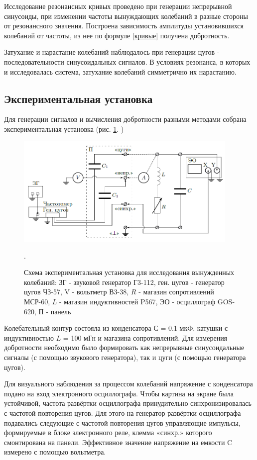 \documentclass[a4paper,12pt]{article} %
\begin{document}
Исследование резонансных кривых проведено при генерации непрерывной синусоиды, при изменении частоты вынуждающих колебаний в разные стороны от резонансного значения. Построена зависимость амплитуды установившихся колебаний от частоты, из нее по формуле \ref{кривые} получена добротность.

Затухание и нарастание колебаний наблюдалось при генерации цугов - последовательности синусоидальных сигналов. В условиях резонанса, в которых и исследовалась система, затухание колебаний симметрично их нарастанию.


\subsection*{Экспериментальная установка}

Для генерации сигналов и вычисления добротности разными методами собрана экспериментальная установка (рис.  \ref{установка}. )
\begin{figure}[h!]
\begin{center}
\includegraphics[width=0.95\textwidth]{установка}
\caption{Схема экспериментальная установка для исследования вынужденных
колебаний: ЗГ - звуковой генератор Г3-112, ген. цугов - генератор цугов ЧЗ-57, V - вольтметр В3-38, $R$ - магазин сопротивлений МСР-60, $L$ - магазин индуктивностей P567, ЭО - осциллограф GOS-620, П - панель} \label{установка}.
\end{center}
\end{figure} 

Колебательный контур состояла из конденсатора $С $ = 0.1 мкФ, катушки с индуктивностью $L$ = 100 мГн и магазина сопротивлений. Для измерения добротности необходимо было формировать как непрерывные синусоидальные сигналы (с помощью звукового генератора), так и цуги (с помощью генератора цугов). 

Для визуального наблюдения за процессом колебаний напряжение с конденсатора подано на вход электронного осциллографа. Чтобы картина на экране была устойчивой, частота развёртки осциллографа принудительно синхронизировалась с частотой повторения цугов. Для этого на генератор развёртки осциллографа подавались следующие с частотой повторения цугов управляющие импульсы, формируемые в блоке электронного реле, клемма «синхр.» которого смонтирована на панели. Эффективное значение напряжение на емкости C измерено с помощью вольтметра.
\end{document}
